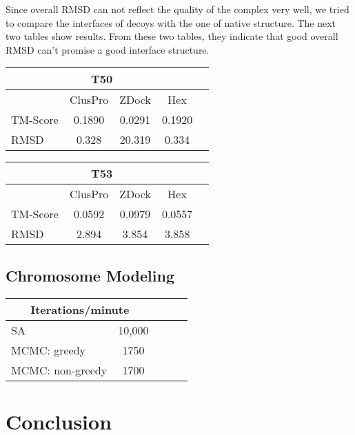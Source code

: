 \documentclass{article}
\begin{document}
Since overall RMSD can not reflect the quality of the complex very well, we tried to compare the interfaces of decoys with the one of native structure. The next two tables show results. From these two tables, they indicate that good overall RMSD can’t promise a good interface structure.

\begin{center}
\begin{tabular}{|l|c|c|c|r|}
\multicolumn{4}{c}{T50} \\
    \hline
      & ClusPro & ZDock & Hex \\ \hline
    TM-Score & 0.1890 & 0.0291 & 0.1920 \\ \hline
    RMSD & 0.328 & 20.319 & 0.334 \\
    \hline
    \end{tabular}
\end{center}


\begin{center}
\begin{tabular}{|l|c|c|c|r|}
\multicolumn{4}{c}{T53} \\
    \hline
      & ClusPro & ZDock & Hex \\ \hline
    TM-Score & 0.0592 & 0.0979 & 0.0557 \\ \hline
    RMSD & 2.894 & 3.854 & 3.858 \\
    \hline
    \end{tabular}
\end{center}


\subsection{Chromosome Modeling}

\begin{center}
\begin{tabular}{|l|c|c|c|r|}
\multicolumn{2}{c}{Iterations/minute} \\
    \hline
    SA & 10,000 \\ \hline
    MCMC: greedy & 1750    \\ \hline
    MCMC: non-greedy & 1700    \\ \hline
    \end{tabular}
\end{center}


\section{Conclusion}
\end{document}
